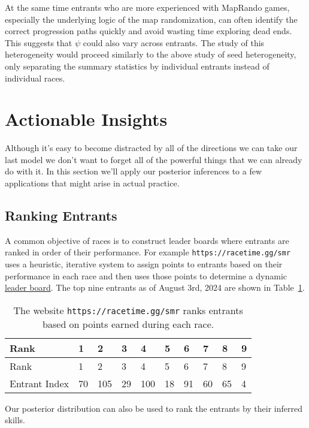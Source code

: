 \documentclass[
  letterpaper,
  DIV=11,
  numbers=noendperiod]{scrartcl}
\begin{document}
At the same time entrants who are more experienced with MapRando games,
especially the underlying logic of the map randomization, can often
identify the correct progression paths quickly and avoid wasting time
exploring dead ends. This suggests that \(\psi\) could also vary across
entrants. The study of this heterogeneity would proceed similarly to the
above study of seed heterogeneity, only separating the summary
statistics by individual entrants instead of individual races.

\section{Actionable Insights}\label{actionable-insights}

Although it's easy to become distracted by all of the directions we can
take our last model we don't want to forget all of the powerful things
that we can already do with it. In this section we'll apply our
posterior inferences to a few applications that might arise in actual
practice.

\subsection{Ranking Entrants}\label{ranking-entrants}

A common objective of races is to construct leader boards where entrants
are ranked in order of their performance. For example
\texttt{https://racetime.gg/smr} uses a heuristic, iterative system to
assign points to entrants based on their performance in each race and
then uses those points to determine a dynamic
\href{https://racetime.gg/smr/leaderboards}{leader board}. The top nine
entrants as of August 3rd, 2024 are shown in
Table~\ref{tbl-leader-board}.

\begin{longtable}[]{@{}llllllllll@{}}
\caption{The website \texttt{https://racetime.gg/smr} ranks entrants
based on points earned during each
race.}\label{tbl-leader-board}\tabularnewline
\toprule\noalign{}
Rank & 1 & 2 & 3 & 4 & 5 & 6 & 7 & 8 & 9 \\
\midrule\noalign{}
\endfirsthead
\toprule\noalign{}
Rank & 1 & 2 & 3 & 4 & 5 & 6 & 7 & 8 & 9 \\
\midrule\noalign{}
\endhead
\bottomrule\noalign{}
\endlastfoot
Entrant Index & 70 & 105 & 29 & 100 & 18 & 91 & 60 & 65 & 4 \\
\end{longtable}

Our posterior distribution can also be used to rank the entrants by
their inferred skills.
\end{document}
